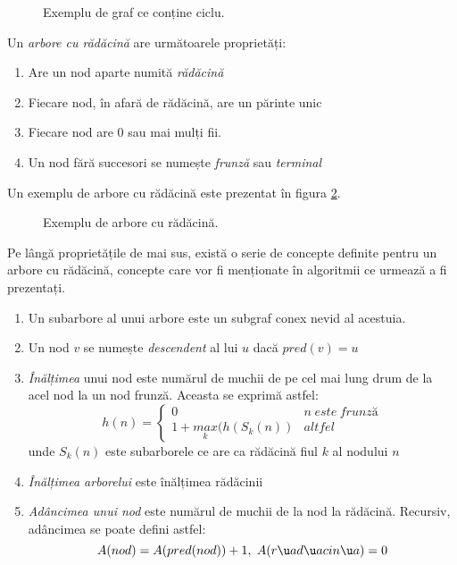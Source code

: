 \begin{figure}[H] 
	\centering	
	{
	}
	\caption{Exemplu de graf ce conține ciclu.} 
	\label{fig:ciclu}
\end{figure}
 
Un \textit{arbore cu rădăcină} are următoarele proprietăți:

\begin{enumerate}
	\item Are un nod aparte numită \textit{rădăcină}
	\item Fiecare nod, în afară de rădăcină, are un părinte unic
	\item Fiecare nod are 0 sau mai mulți fii.
	\item Un nod fără succesori se numește \textit{frunză} sau \textit{terminal}	
\end{enumerate}

Un exemplu de arbore cu rădăcină este prezentat în figura \ref{fig:arboreradacina}.

\begin{figure}[H] 
	\centering	
	{
	}
	\caption{Exemplu de arbore cu rădăcină.} 
	\label{fig:arboreradacina}
\end{figure}

Pe lângă proprietățile de mai sus, există o serie de concepte definite pentru un arbore cu rădăcină, concepte care vor fi menționate în algoritmii ce urmează a fi prezentați.

\begin{enumerate}
	\item Un subarbore al unui arbore este un subgraf conex nevid al acestuia.
	\item Un nod $v$ se numește \textit{descendent} al lui $u$ dacă $pred(v)=u$
	\item \textit{Înălțimea} unui nod este numărul de muchii de pe cel mai lung drum de la acel nod la un nod frunză. Aceasta se exprimă astfel:
	\begin{equation}
		h(n) = \left\{\begin{matrix}
		0 & n \hspace{3pt} este  \hspace{3pt} frunză\\ 
		1 + \underset{k}{max} (h(S_k(n)) & 	altfel	
		\end{matrix}\right.
	\end{equation}
	unde $S_k(n)$ este subarborele ce are ca rădăcină fiul $k$ al nodului $n$
	\item  \textit{Înălțimea arborelui} este înălțimea rădăcinii 
	\item \textit{Adâncimea unui nod} este numărul de muchii de la nod la rădăcină. Recursiv, adâncimea se poate defini astfel:
	\begin{equation}
	A(nod) = A(pred(nod))+1, \\ \hspace{3pt}
	A(rădăcină) = 0
	\end{equation}
	
\end{enumerate}


